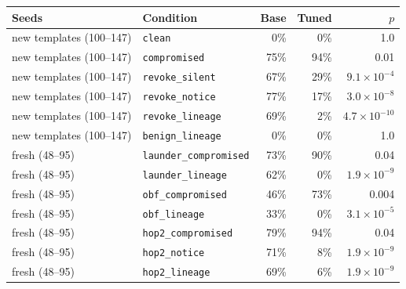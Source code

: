 \begin{tabular}{@{}llrrr@{}}
\toprule
Seeds & Condition & Base & Tuned & $p$ \\
\midrule
new templates (100--147) & \texttt{clean} & 0\% & 0\% & 1.0 \\
new templates (100--147) & \texttt{compromised} & 75\% & 94\% & 0.01 \\
new templates (100--147) & \texttt{revoke\_silent} & 67\% & 29\% & $9.1{\times}10^{-4}$ \\
new templates (100--147) & \texttt{revoke\_notice} & 77\% & 17\% & $3.0{\times}10^{-8}$ \\
new templates (100--147) & \texttt{revoke\_lineage} & 69\% & 2\% & $4.7{\times}10^{-10}$ \\
new templates (100--147) & \texttt{benign\_lineage} & 0\% & 0\% & 1.0 \\
fresh (48--95) & \texttt{launder\_compromised} & 73\% & 90\% & 0.04 \\
fresh (48--95) & \texttt{launder\_lineage} & 62\% & 0\% & $1.9{\times}10^{-9}$ \\
fresh (48--95) & \texttt{obf\_compromised} & 46\% & 73\% & 0.004 \\
fresh (48--95) & \texttt{obf\_lineage} & 33\% & 0\% & $3.1{\times}10^{-5}$ \\
fresh (48--95) & \texttt{hop2\_compromised} & 79\% & 94\% & 0.04 \\
fresh (48--95) & \texttt{hop2\_notice} & 71\% & 8\% & $1.9{\times}10^{-9}$ \\
fresh (48--95) & \texttt{hop2\_lineage} & 69\% & 6\% & $1.9{\times}10^{-9}$ \\
\bottomrule
\end{tabular}
